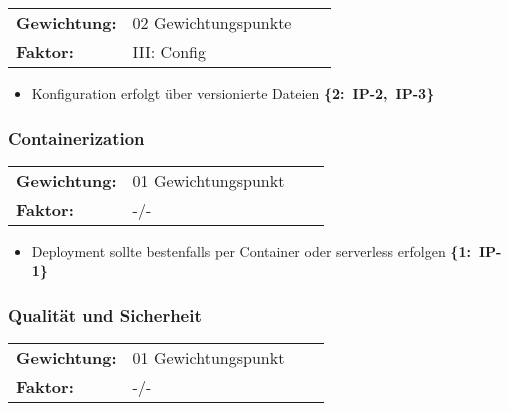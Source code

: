 \vspace{0.5em}
\begin{tabular}{ll@{}ll@{}}
    \textbf{Gewichtung:}    &   02 Gewichtungspunkte    \\
    \textbf{Faktor:}        &   III: Config             \\
\end{tabular}

\begin{flushleft}
    \begin{itemize}
        \item Konfiguration erfolgt über versionierte Dateien \mbox{\textbf{\{2: IP-2, IP-3\}}}
    \end{itemize}
\end{flushleft}

\subsubsection{Containerization}
\label{subsubsec:AA-04-02-03_req-dep-containerization}

\vspace{0.5em}
\begin{tabular}{ll@{}ll@{}}
    \textbf{Gewichtung:}    &   01 Gewichtungspunkt     \\
    \textbf{Faktor:}        &   -/-                     \\
\end{tabular}

\begin{flushleft}
    \begin{itemize}
        \item Deployment sollte bestenfalls per Container oder serverless erfolgen \mbox{\textbf{\{1: IP-1\}}}
    \end{itemize}
\end{flushleft}

\subsubsection{Qualität und Sicherheit}
\label{subsubsec:AA-04-02-04_req-dep-quality-security}

\vspace{0.5em}
\begin{tabular}{ll@{}ll@{}}
    \textbf{Gewichtung:}    &   01 Gewichtungspunkt     \\
    \textbf{Faktor:}        &   -/-                     \\
\end{tabular}

